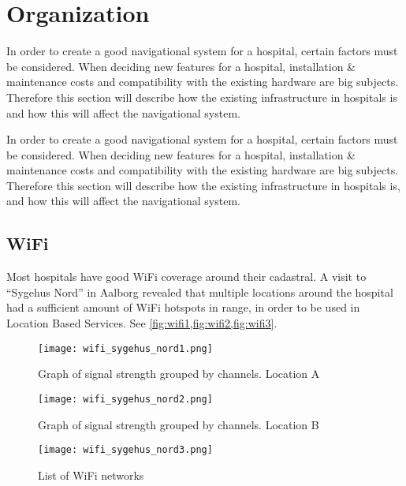 \section{Organization} %
\label{sec:organization}


In order to create a good navigational system for a hospital, certain factors must be considered. When deciding new features for a hospital, installation \& maintenance costs and compatibility with the existing hardware are big subjects. Therefore this section will describe how the existing infrastructure in hospitals is and how this will affect the navigational system.


In order to create a good navigational system for a hospital, certain factors must be considered. When deciding new features for a hospital, installation \& maintenance costs and compatibility with the existing hardware are big subjects. Therefore this section will describe how the existing infrastructure in hospitals is, and how this will affect the navigational system.

\subsection{WiFi}

Most hospitals have good WiFi coverage around their cadastral. A visit to \enquote{Sygehus Nord} in Aalborg revealed that multiple locations around the hospital had a sufficient amount of WiFi hotspots in range, in order to be used in Location Based Services. See \cref{fig:wifi1,fig:wifi2,fig:wifi3}.

\begin{figure}
\centering
  \begin{minipage}{0.45\textwidth}
    \centering
    \texttt{[image: wifi\_sygehus\_nord1.png]}
    \caption{Graph of signal strength grouped by channels. Location A} \label{fig:wifi1}
  \end{minipage}
  \hfill
  \begin{minipage}{0.45\textwidth}
    \centering
    \texttt{[image: wifi\_sygehus\_nord2.png]}
    \caption{Graph of signal strength grouped by channels. Location B} \label{fig:wifi2}
  \end{minipage}
    \begin{minipage}{0.45\textwidth}
    \centering
    \texttt{[image: wifi\_sygehus\_nord3.png]}
    \caption{List of WiFi networks} \label{fig:wifi3}
  \end{minipage}
  \end{figure}


